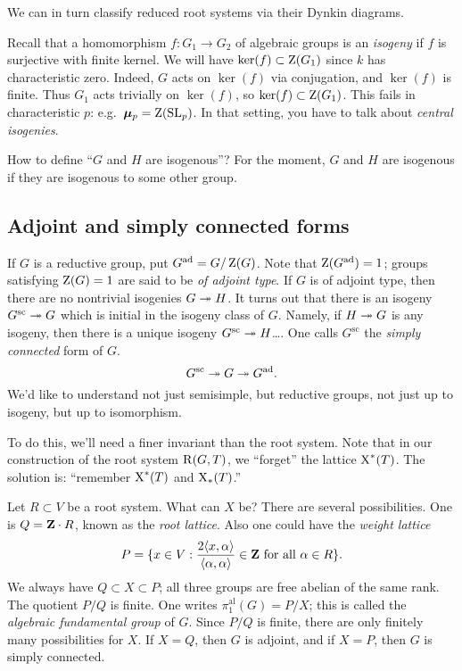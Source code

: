 We can in turn classify reduced root systems via their Dynkin diagrams. 

Recall that a homomorphism $f\colon G_1\to G_2$ of algebraic groups is an 
\emph{isogeny} if $f$ is surjective with finite kernel. We will have 
$\ker(f)\subset \operatorname{Z}(G_1)$ since $k$ has characteristic zero. Indeed, 
$G$ acts on $\ker(f)$ via conjugation, and $\ker(f)$ is finite. Thus $G_1$ acts 
trivially on $\ker(f)$, so $\ker(f)\subset \operatorname{Z}(G_1)$. This fails in 
characteristic $p$: e.g.~$\bm{\mu}_p=\operatorname{Z}(\operatorname{SL}_p)$. In that setting, you have 
to talk about \emph{central isogenies}. 

How to define ``$G$ and $H$ are isogenous''? For the moment, $G$ and $H$ are 
isogenous if they are isogenous to some other group. 

\subsection{Adjoint and simply connected forms}

If $G$ is a reductive group, put $G^\mathrm{ad}=G/\operatorname{Z}(G)$. Note that 
$\operatorname{Z}(G^\mathrm{ad})=1$; groups satisfying $\operatorname{Z}(G)=1$ are said to be 
\emph{of adjoint type}. If $G$ is of adjoint type, then there are no nontrivial 
isogenies $G\twoheadrightarrow H$. 
It turns out that there is an isogeny 
$G^\mathrm{sc}\twoheadrightarrow G$ which is initial in the isogeny class of $G$. Namely, if 
$H\twoheadrightarrow G$ is any isogeny, then there is a unique isogeny $G^\mathrm{sc}\twoheadrightarrow H$\ldots. 
One calls $G^\mathrm{sc}$ the \emph{simply connected} form of $G$. 
\[
  G^\mathrm{sc}\twoheadrightarrow G\twoheadrightarrow G^\mathrm{ad} .
\]
We'd like to understand not just semisimple, but reductive groups, not just 
up to isogeny, but up to isomorphism. 

To do this, we'll need a finer invariant than the root system. Note that in our 
construction of the root system $\operatorname{R}(G,T)$, we ``forget'' the lattice 
$\operatorname{X}^\ast(T)$. The solution is: ``remember $\operatorname{X}^\ast(T)$ and 
$\operatorname{X}_\ast(T)$.''

Let $R\subset V$ be a root system. What can $X$ be? There are several possibilities. 
One is $Q=\mathbf{Z}\cdot R$, known as the \emph{root lattice}. Also one could have the 
\emph{weight lattice} 
\[
  P=\{x\in V:\frac{2\langle x,\alpha\rangle}{\langle\alpha,\alpha\rangle}\in \mathbf{Z}\text{ for all }\alpha\in R\} .
\]
We always have $Q\subset X\subset P$; all three groups are free abelian of the 
same rank. The quotient $P/Q$ is finite. One writes 
$\pi_1^\mathrm{al}(G)=P/X$; this is called the \emph{algebraic fundamental group} of 
$G$. Since $P/Q$ is finite, there are only finitely many 
possibilities for $X$. If $X=Q$, then $G$ is adjoint, and if $X=P$, then $G$ is 
simply connected. 




